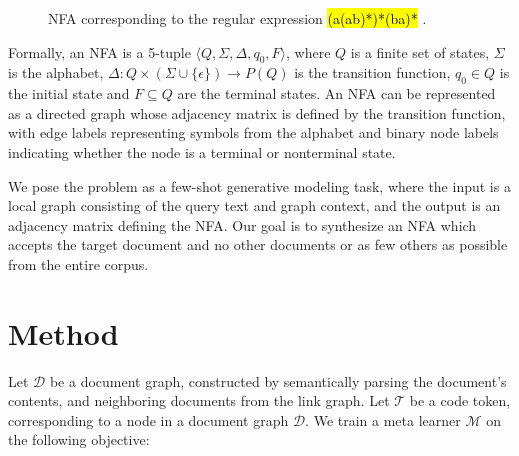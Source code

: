 \documentclass{article}
\newcommand{\tinline}[1]{%
    \begingroup%
    \sethlcolor{slightgray}%
    \hl{\ttfamily\footnotesize #1}%
    \endgroup
}
\begin{document}
\begin{figure}
    \caption{NFA corresponding to the regular expression \tinline{(a(ab)*)*(ba)*}.}
    \label{fig:regex_to_nfa}
\end{figure}

Formally, an NFA is a 5-tuple $\langle Q, \Sigma, \Delta, q_0, F \rangle$, where $Q$ is a finite set of states, $\Sigma$ is the alphabet, $\Delta :Q\times (\Sigma \cup \{\epsilon \})\rightarrow P(Q)$ is the transition function, $q_0 \in Q$ is the initial state and $F \subseteq Q$ are the terminal states. An NFA can be represented as a directed graph whose adjacency matrix is defined by the transition function, with edge labels representing symbols from the alphabet and binary node labels indicating whether the node is a terminal or nonterminal state.

We pose the problem as a few-shot generative modeling task, where the input is a local graph consisting of the query text and graph context, and the output is an adjacency matrix defining the NFA. Our goal is to synthesize an NFA which accepts the target document and no other documents or as few others as possible from the entire corpus.

\section{Method}

Let $\mathcal D$ be a document graph, constructed by semantically parsing the document's contents, and neighboring documents from the link graph. Let $\mathcal T$ be a code token, corresponding to a node in a document graph $\mathcal D$.  We train a meta learner $\mathcal M$ on the following objective:
\end{document}
